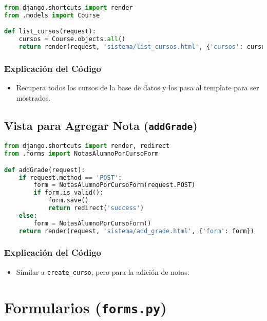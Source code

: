 \begin{lstlisting}[language=Python, caption=Vista para Listar Cursos]
from django.shortcuts import render
from .models import Course

def list_cursos(request):
    cursos = Course.objects.all()
    return render(request, 'sistema/list_cursos.html', {'cursos': cursos})
\end{lstlisting}

\subsubsection{Explicación del Código}

\begin{itemize}
    \item Recupera todos los cursos de la base de datos y los pasa al template para ser mostrados.
\end{itemize}

\subsection{Vista para Agregar Nota (\texttt{addGrade})}

\begin{lstlisting}[language=Python, caption=Vista para Agregar Nota]
from django.shortcuts import render, redirect
from .forms import NotasAlumnoPorCursoForm

def addGrade(request):
    if request.method == 'POST':
        form = NotasAlumnoPorCursoForm(request.POST)
        if form.is_valid():
            form.save()
            return redirect('success')
    else:
        form = NotasAlumnoPorCursoForm()
    return render(request, 'sistema/add_grade.html', {'form': form})
\end{lstlisting}

\subsubsection{Explicación del Código}

\begin{itemize}
    \item Similar a \texttt{create\_curso}, pero para la adición de notas.
\end{itemize}

\section{Formularios (\texttt{forms.py})}


